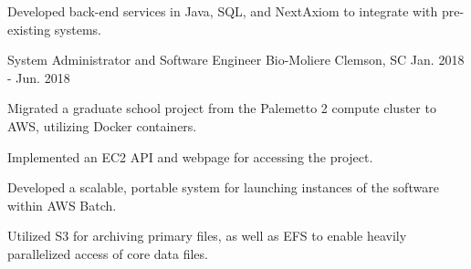 \begin{cventries}
{\begin{cvitems}
            \item {Developed back-end services in Java, SQL, and NextAxiom to integrate with pre-existing systems.}
        \end{cvitems}
    }
  \cventry
    {System Administrator and Software Engineer} %
    {Bio-Moliere} %
    {Clemson, SC} %
    {Jan. 2018 - Jun. 2018} %
    {
      \begin{cvitems} %
        \item {Migrated a graduate school project from the Palemetto 2 compute cluster to AWS, utilizing Docker containers.}
        \item {Implemented an EC2 API and webpage for accessing the project.}
        \item {Developed a scalable, portable system for launching instances of the software within AWS Batch.}
        \item {Utilized S3 for archiving primary files, as well as EFS to enable heavily parallelized access of core data files.}
      \end{cvitems}
    }
    

\end{cventries}
